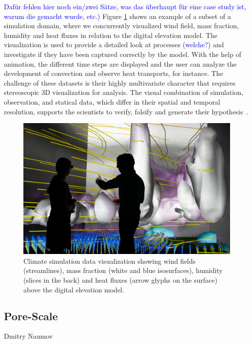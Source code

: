 \documentclass[twocolumn]{svjour3}          %
\newcommand{\myedit}[2]{\textcolor{red}{\st{#1}} \textcolor{blue}{#2}}
\begin{document}
\myedit{}{Daf\"ur fehlen hier noch ein/zwei S\"atze, was das \"uberhaupt f\"ur eine case study ist, warum die gemacht wurde, etc.)} Figure \ref{fig:wind} shows an example of a subset of a simulation domain, where we concurrently visualized wind field, mass fraction, humidity and heat fluxes in relation to the digital elevation model. The visualization is used to provide a detailed look at processes \myedit{}{(welche?)} and investigate if they have been captured correctly by the model. With the help of animation, the different time steps are displayed and the user can analyze the development of convection and observe heat transports, for instance. The challenge of these datasets is their highly multivariate character that requires stereoscopic 3D visualization for analysis. The visual combination of simulation, observation, and statical data, which differ in their spatial and temporal resolution, supports the scientists to verify, falsify and generate their hypothesis~\cite{helbig:eesenvirvis}.

\begin{figure}
  \includegraphics[width=\linewidth]{images/wind.jpg}
  \caption{Climate simulation data visualization showing wind fields (streamlines), mass fraction (white and blue isosurfaces), humidity (slices in the back) and heat fluxes (arrow glyphs on the surface) above the digital elevation model.}
\label{fig:wind}
\end{figure}

\subsection{Pore-Scale}
\label{pore-scale}

Dmitry Naumov
\end{document}
